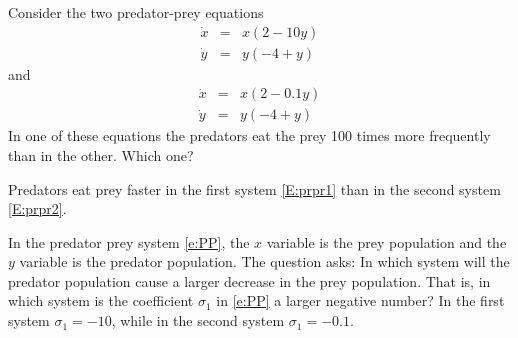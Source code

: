 \documentclass{ximera}
\begin{document}
\begin{exercise} \label{c9.1.5}
Consider the two predator-prey equations
\begin{equation} \label{E:prpr1}
\begin{array}{rcl}
\dot{x} & = & x(2-10y)\\
\dot{y} & = & y(-4+y)
\end{array}
\end{equation}
and 
\begin{equation} \label{E:prpr2}
\begin{array}{rcl}
\dot{x} & = & x(2-0.1y)\\
\dot{y} & = & y(-4+y)
\end{array}
\end{equation}
In one of these equations the predators eat the prey 100 times more 
frequently than in the other.  Which one?

\begin{solution}

\ans Predators eat prey faster in the first system \eqref{E:prpr1} than in 
the second system \eqref{E:prpr2}.

\soln  In the predator prey system \eqref{e:PP}, the $x$ variable is the
prey population and the $y$ variable is the predator population.  The
question asks: In which system will the predator population cause a
larger decrease in the prey population.  That is, in which system is
the coefficient $\sigma_1$ in \eqref{e:PP} a larger negative number?  In
the first system $\sigma_1=-10$, while in the second system $\sigma_1=-0.1$.

\end{solution}
\end{exercise}
\end{document}
